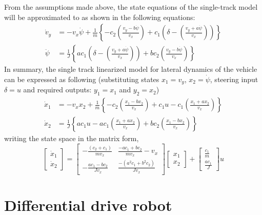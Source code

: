 From the assumptions made above, the state equations of the single-track model will be approximated to as shown in the following equations:
\begin{align}
	\dot{v}_y &= -v_x \dot{\psi} + \frac{1}{m} \left\{ - c_{2}\left(\frac{v_y - b \dot{\psi}}{v_x}\right) + c_{1}\left(\delta - \left(\frac{v_y + a\dot{\psi}}{v_x}\right)\right) \right\} \label{eq_2_ch_3_BicycleModel_VY_Linear} \\
	\ddot{\psi} &= \frac{1}{J} \left\{ a c_{1}\left(\delta - \left(\frac{v_y + a\dot{\psi}}{v_x}\right)\right) + b c_{2}\left(\frac{v_y - b \dot{\psi}}{v_x}\right)\right\} \label{eq_2_ch_3_BicycleModel_MZ_Linear}
\end{align}
In summary, the single track linearized model for lateral dynamics of the vehicle can be expressed as following (substituting states $x_1 = v_y$, $x_2 = \dot{\psi}$, steering input $\delta = u$ and required outputs: $y_1 = x_1 $ and $y_2 = x_2$)
\begin{align}
		\dot{x}_{1} &= -v_x x_{2} + \frac{1}{m} \left\{ - c_{2}\left(\frac{x_{1} - b x_{2}}{v_x}\right) + c_{1}u - c_{1} \left(\frac{x_{1} + ax_{2}}{v_x}\right) \right\} \label{eq_2_ch_3_BicycleModel_VY_Linear_SS} \\
	\dot{x}_{2} &= \frac{1}{J} \left\{ a c_{1}u - a c_{1} \left(\frac{x_{1} + ax_{2}}{v_x}\right) + b c_{2}\left(\frac{x_{1} - b x_{2}}{v_x}\right)\right\} \label{eq_2_ch_3_BicycleModel_MZ_Linear_SS}
\end{align}
writing the state space in the matrix form,
\begin{equation}
	\begin{bmatrix}\dot{x}_{1} \\ \dot{x}_{2} \end{bmatrix} = \begin{bmatrix} -\frac{(c_2 + c_1)}{m v_x} & \frac{-a c_1 + b c_2}{m v_x} - v_x \\
	-\frac{a c_1 - b c_2}{J v_x} & \frac{-(a^{2} c_1 + b^{2} c_2)}{J v_x} \end{bmatrix}\begin{bmatrix} x_1 \\ x_2 \end{bmatrix} + \begin{bmatrix} \frac{c_1}{m} \\ \frac{a c_1}{J} \end{bmatrix} u
\end{equation}

\section{Differential drive robot}

